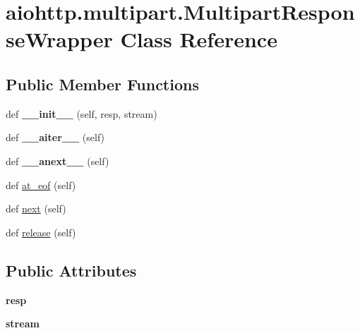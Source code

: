 \hypertarget{classaiohttp_1_1multipart_1_1_multipart_response_wrapper}{}\section{aiohttp.\+multipart.\+Multipart\+Response\+Wrapper Class Reference}
\label{classaiohttp_1_1multipart_1_1_multipart_response_wrapper}
\subsection*{Public Member Functions}
\begin{DoxyCompactItemize}
\item 
\mbox{\label{classaiohttp_1_1multipart_1_1_multipart_response_wrapper_aea4a3071d426122765f5221e58847827}} 
def {\bfseries \+\_\+\+\_\+init\+\_\+\+\_\+} (self, resp, stream)
\item 
\mbox{\label{classaiohttp_1_1multipart_1_1_multipart_response_wrapper_a91b8b151c2c28b69de09cff1e898d461}} 
def {\bfseries \+\_\+\+\_\+aiter\+\_\+\+\_\+} (self)
\item 
\mbox{\label{classaiohttp_1_1multipart_1_1_multipart_response_wrapper_a6001133cd2422489920dcab5f74ed1a0}} 
def {\bfseries \+\_\+\+\_\+anext\+\_\+\+\_\+} (self)
\item 
def \hyperlink{classaiohttp_1_1multipart_1_1_multipart_response_wrapper_af86234292ee8ba0be29210b08f3b1126}{at\+\_\+eof} (self)
\item 
def \hyperlink{classaiohttp_1_1multipart_1_1_multipart_response_wrapper_ae70d44e747019ec003377347bfd09740}{next} (self)
\item 
def \hyperlink{classaiohttp_1_1multipart_1_1_multipart_response_wrapper_a00580c25330fc7d7bada33b767c8f411}{release} (self)
\end{DoxyCompactItemize}
\subsection*{Public Attributes}
\begin{DoxyCompactItemize}
\item 
\mbox{\label{classaiohttp_1_1multipart_1_1_multipart_response_wrapper_ae1acee62757244c52fc1cba2c3c12d27}} 
{\bfseries resp}
\item 
\mbox{\label{classaiohttp_1_1multipart_1_1_multipart_response_wrapper_a7cde86ca66192143fff577893e117c16}} 
{\bfseries stream}
\end{DoxyCompactItemize}


